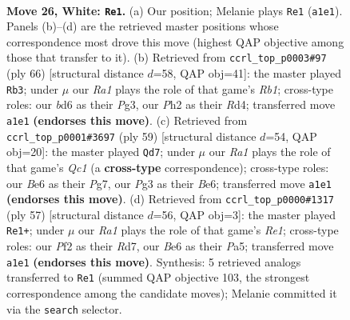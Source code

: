 \documentclass[11pt]{article}
\begin{document}
\clearpage

\begin{figure}[p]\centering
\begin{subfigure}{0.46\textwidth}\centering
\resizebox{\linewidth}{!}{%
\newchessgame
\chessboard[
  setfen={8/pp4kp/3bB1p1/8/8/5qP1/PP3P1P/R5K1 w - - 1 26},
  showmover=false,
  pgfstyle=straightmove, color=movearrow, markmove={a1-e1}
]}
\caption{}
\end{subfigure}\hfill
\begin{subfigure}{0.46\textwidth}\centering
\resizebox{\linewidth}{!}{%
\newchessgame
\chessboard[
  setfen={6k1/1p3p2/1p6/7p/3RP1p1/6P1/4qP1P/1R4K1 w - - 0 34},
  showmover=false,
  pgfstyle=straightmove, color=movearrow, markmove={b1-b3}
]}
\caption{}
\end{subfigure}
\\[4pt]
\begin{subfigure}{0.46\textwidth}\centering
\resizebox{\linewidth}{!}{%
\newchessgame
\chessboard[
  setfen={2q3k1/5pp1/2p1b2p/4Q2P/1P1p4/3B4/5PP1/6K1 b - - 4 30},
  showmover=false,
  pgfstyle=straightmove, color=movearrow, markmove={c8-d7}
]}
\caption{}
\end{subfigure}\hfill
\begin{subfigure}{0.46\textwidth}\centering
\resizebox{\linewidth}{!}{%
\newchessgame
\chessboard[
  setfen={4r1k1/3r1p2/2Q3p1/p1P2p1p/8/6P1/PP3P1P/6K1 b - - 0 29},
  showmover=false,
  pgfstyle=straightmove, color=movearrow, markmove={e8-e1}
]}
\caption{}
\end{subfigure}
\caption{\textbf{Move 26, White: \texttt{Re1}.} (a) Our position; Melanie plays \texttt{Re1} (\texttt{a1e1}). Panels (b)--(d) are the retrieved master positions whose correspondence most drove this move (highest QAP objective among those that transfer to it). (b) Retrieved from \texttt{ccrl\_top\_p0003\#97} (ply 66) [structural distance $d$=58, QAP obj=41]: the master played \texttt{Rb3}; under $\mu$ our \emph{Ra1} plays the role of that game's \emph{Rb1}; cross-type roles: our \emph{b}d6 as their \emph{P}g3, our \emph{P}h2 as their \emph{R}d4; transferred move \texttt{a1e1} \textbf{(endorses this move)}. (c) Retrieved from \texttt{ccrl\_top\_p0001\#3697} (ply 59) [structural distance $d$=54, QAP obj=20]: the master played \texttt{Qd7}; under $\mu$ our \emph{Ra1} plays the role of that game's \emph{Qc1} (a \textbf{cross-type} correspondence); cross-type roles: our \emph{B}e6 as their \emph{P}g7, our \emph{P}g3 as their \emph{B}e6; transferred move \texttt{a1e1} \textbf{(endorses this move)}. (d) Retrieved from \texttt{ccrl\_top\_p0000\#1317} (ply 57) [structural distance $d$=56, QAP obj=3]: the master played \texttt{Re1+}; under $\mu$ our \emph{Ra1} plays the role of that game's \emph{Re1}; cross-type roles: our \emph{P}f2 as their \emph{R}d7, our \emph{B}e6 as their \emph{P}a5; transferred move \texttt{a1e1} \textbf{(endorses this move)}. Synthesis: 5 retrieved analogs transferred to \texttt{Re1} (summed QAP objective 103, the strongest correspondence among the candidate moves); Melanie committed it via the \texttt{search} selector.}
\label{fig:thought-m50}
\end{figure}
\end{document}
